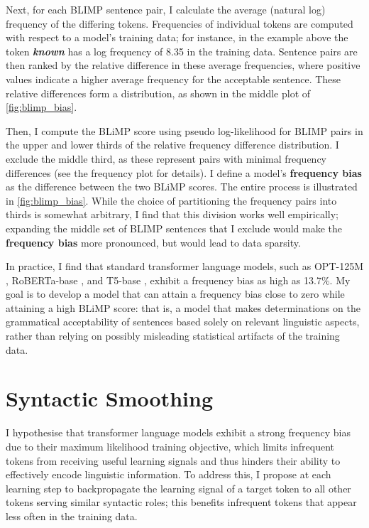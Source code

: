 Next, for each BLIMP sentence pair, I calculate the average (natural log) frequency of the differing tokens. Frequencies of individual tokens are computed with respect to a model's training data; for instance, in the example above the token \textit{\textbf{known}} has a log frequency of 8.35 in the training data. Sentence pairs are then ranked by the relative difference in these average frequencies, where positive values indicate a higher average frequency for the acceptable sentence. These relative differences form a distribution, as shown in the middle plot of \cref{fig:blimp_bias}. 

Then, I compute the BLiMP score using pseudo log-likelihood \citep{salazar2020masked} for BLIMP pairs in the upper and lower thirds of the relative frequency difference distribution. I exclude the middle third, as these represent pairs with minimal frequency differences (see the frequency plot for details). I define a model's \textbf{frequency bias} as the difference between the two BLiMP scores. The entire process is illustrated in \cref{fig:blimp_bias}. While the choice of partitioning the frequency pairs into thirds is somewhat arbitrary, I find that this division works well empirically; expanding the middle set of BLIMP sentences that I exclude would make the \textbf{frequency bias} more pronounced, but would lead to data sparsity. 

In practice, I find that standard transformer language models, such as OPT-125M \citep{zhang2022opt}, RoBERTa-base \citep{liu2019roberta}, and T5-base \citep{raffel2020t5}, exhibit a frequency bias as high as 13.7\%. My goal is to develop a model that can attain a frequency bias close to zero while attaining a high BLiMP score: that is, a model that makes determinations on the grammatical acceptability of sentences based solely on relevant linguistic aspects, rather than relying on possibly misleading statistical artifacts of the training data. 

\section{Syntactic Smoothing}
\label{sec:smoothing-method}

I hypothesise that transformer language models exhibit a strong frequency bias due to their maximum likelihood training objective, which limits infrequent tokens from receiving useful learning signals and thus hinders their ability to effectively encode linguistic information. To address this, I propose at each learning step to backpropagate the learning signal of a target token to all other tokens serving similar syntactic roles; this benefits infrequent tokens that appear less often in the training data.

